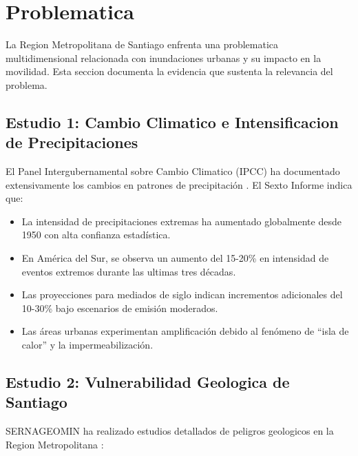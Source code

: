 \documentclass[conference]{IEEEtran}
\begin{document}
\section{Problematica}

La Region Metropolitana de Santiago enfrenta una problematica multidimensional relacionada con inundaciones urbanas y su impacto en la movilidad. Esta seccion documenta la evidencia que sustenta la relevancia del problema.

\subsection{Estudio 1: Cambio Climatico e Intensificacion de Precipitaciones}

El Panel Intergubernamental sobre Cambio Climatico (IPCC) ha documentado extensivamente los cambios en patrones de precipitación \cite{ipcc2021}. El Sexto Informe indica que:

\begin{itemize}
    \item La intensidad de precipitaciones extremas ha aumentado globalmente desde 1950 con alta confianza estadística.
    \item En América del Sur, se observa un aumento del 15-20\% en intensidad de eventos extremos durante las ultimas tres décadas.
    \item Las proyecciones para mediados de siglo indican incrementos adicionales del 10-30\% bajo escenarios de emisión moderados.
    \item Las áreas urbanas experimentan amplificación debido al fenómeno de ``isla de calor'' y la impermeabilización.
\end{itemize}

\subsection{Estudio 2: Vulnerabilidad Geologica de Santiago}

SERNAGEOMIN ha realizado estudios detallados de peligros geologicos en la Region Metropolitana \cite{sernageomin2020}:
\end{document}
